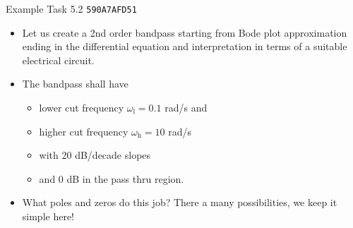 \documentclass[mathserif, aspectratio=43]{intbeamer}
\begin{document}
\begin{frame}{Example Task 5.2 \texttt{\tiny 590A7AFD51}}

\begin{itemize}
\item Let us create a 2nd order bandpass starting from Bode plot approximation ending
in the differential equation and interpretation in terms of a suitable electrical circuit.

\item The bandpass shall have

\begin{itemize}
  \item lower cut frequency $\omega_\mathrm{l}=0.1$ rad/s and
  \item higher cut frequency $\omega_\mathrm{h}=10$ rad/s
  \item with 20 dB/decade slopes
  \item and 0 dB in the pass thru region.
\end{itemize}

\item  What poles and zeros do this job? There a many possibilities, we keep it simple here!
\end{itemize}

\end{frame}
\end{document}
